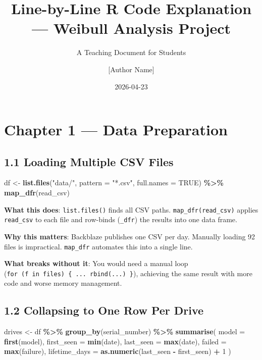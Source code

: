\documentclass[
]{article}
\title{Line-by-Line R Code Explanation --- Weibull Analysis Project}
\subtitle{A Teaching Document for Students}
\author{{[}Author Name{]}}
\date{2026-04-23}
\newenvironment{Shaded}{\begin{snugshade}}{\end{snugshade}}
\newcommand{\AttributeTok}[1]{\textcolor[rgb]{0.13,0.29,0.53}{#1}}
\newcommand{\ConstantTok}[1]{\textcolor[rgb]{0.56,0.35,0.01}{#1}}
\newcommand{\DecValTok}[1]{\textcolor[rgb]{0.00,0.00,0.81}{#1}}
\newcommand{\FunctionTok}[1]{\textcolor[rgb]{0.13,0.29,0.53}{\textbf{#1}}}
\newcommand{\NormalTok}[1]{#1}
\newcommand{\OtherTok}[1]{\textcolor[rgb]{0.56,0.35,0.01}{#1}}
\newcommand{\SpecialCharTok}[1]{\textcolor[rgb]{0.81,0.36,0.00}{\textbf{#1}}}
\newcommand{\StringTok}[1]{\textcolor[rgb]{0.31,0.60,0.02}{#1}}
\begin{document}
\maketitle

{
\setcounter{tocdepth}{3}
\tableofcontents
}
\newpage

\section{Chapter 1 --- Data
Preparation}\label{chapter-1-data-preparation}

\subsection{1.1 Loading Multiple CSV
Files}\label{loading-multiple-csv-files}

\begin{Shaded}
\begin{Highlighting}[]
\NormalTok{df }\OtherTok{\textless{}{-}} \FunctionTok{list.files}\NormalTok{(}\StringTok{"data/"}\NormalTok{, }\AttributeTok{pattern =} \StringTok{"*.csv"}\NormalTok{, }\AttributeTok{full.names =} \ConstantTok{TRUE}\NormalTok{) }\SpecialCharTok{\%\textgreater{}\%}
  \FunctionTok{map\_dfr}\NormalTok{(read\_csv)}
\end{Highlighting}
\end{Shaded}

\textbf{What this does}: \texttt{list.files()} finds all CSV paths.
\texttt{map\_dfr(read\_csv)} applies \texttt{read\_csv} to each file and
row-binds (\texttt{\_dfr}) the results into one data frame.

\textbf{Why this matters}: Backblaze publishes one CSV per day. Manually
loading 92 files is impractical. \texttt{map\_dfr} automates this into a
single line.

\textbf{What breaks without it}: You would need a manual loop
(\texttt{for\ (f\ in\ files)\ \{\ ...\ rbind(...)\ \}}), achieving the
same result with more code and worse memory management.

\subsection{1.2 Collapsing to One Row Per
Drive}\label{collapsing-to-one-row-per-drive}

\begin{Shaded}
\begin{Highlighting}[]
\NormalTok{drives }\OtherTok{\textless{}{-}}\NormalTok{ df }\SpecialCharTok{\%\textgreater{}\%}
  \FunctionTok{group\_by}\NormalTok{(serial\_number) }\SpecialCharTok{\%\textgreater{}\%}
  \FunctionTok{summarise}\NormalTok{(}
    \AttributeTok{model         =} \FunctionTok{first}\NormalTok{(model),}
    \AttributeTok{first\_seen    =} \FunctionTok{min}\NormalTok{(date),}
    \AttributeTok{last\_seen     =} \FunctionTok{max}\NormalTok{(date),}
    \AttributeTok{failed        =} \FunctionTok{max}\NormalTok{(failure),}
    \AttributeTok{lifetime\_days =} \FunctionTok{as.numeric}\NormalTok{(last\_seen }\SpecialCharTok{{-}}\NormalTok{ first\_seen) }\SpecialCharTok{+} \DecValTok{1}
\NormalTok{  )}
\end{Highlighting}
\end{Shaded}
\end{document}
